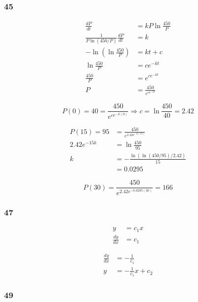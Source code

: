 \documentclass{article}
\begin{document}
\subsubsection{45}

\begin{align*}
  \frac{dP}{dt}                           & = k P \ln \frac{450}{P}      \\
  \frac{1}{P \ln (450 / P)} \frac{dP}{dt} & = k                          \\
  -\ln (\ln \frac{450}{P})                & = kt + c                     \\
  \ln \frac{450}{P}                       & = c e^{-k t}                 \\
  \frac{450}{P}                           & = e^{c e^{-k t}}             \\
  P                                       & = \frac{450}{e^{c e^{-k t}}}
\end{align*}

\[P(0) = 40 = \frac{450}{e^{c e^{-k (0)}}} \Rightarrow c = \ln \frac{450}{40} = 2.42\]

\begin{align*}
  P(15) = 95     & = \frac{450}{e^{2.42 e^{-k (15)}}}        \\
  2.42 e^{-15 k} & = \ln \frac{450}{95}                      \\
  k              & = -\frac{\ln (\ln (450 / 95) / 2.42)}{15} \\
                 & = 0.0295
\end{align*}

\[P(30) = \frac{450}{e^{2.42 e^{-0.0295 (30)}}} = 166\]

\subsubsection{47}

\begin{align*}
  y             & = c_1 x \\
  \frac{dy}{dx} & = c_1
\end{align*}

\begin{align*}
  \frac{dy}{dx} & = -\frac{1}{c_1}         \\
  y             & = -\frac{1}{c_1} x + c_2
\end{align*}

\subsubsection{49}
\end{document}
